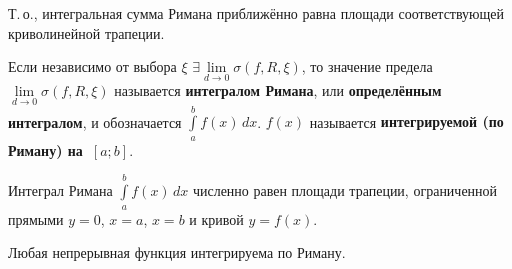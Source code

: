 Т.\,о., интегральная сумма Римана приближённо равна площади соответствующей криволинейной трапеции.

  Если независимо от выбора $\xi$ $\exists \lim\limits_{d \to 0} \sigma(f, R, \xi)$, то значение предела~$\lim\limits_{d \to 0} \sigma(f, R, \xi)$ называется \textbf{интегралом Римана}, или \textbf{определённым интегралом}, и обозначается $\int\limits_a^b f(x)\,dx$.
$f(x)$ называется \textbf{интегрируемой (по Риману) на~$[a; b]$}.

Интеграл Римана $\int\limits_a^b f(x)\,dx$ численно равен площади трапеции, ограниченной прямыми $y = 0$, $x = a$, $x = b$ и кривой $y = f(x)$.

\begin{theorem}
Любая непрерывная функция интегрируема по Риману.
\end{theorem}

